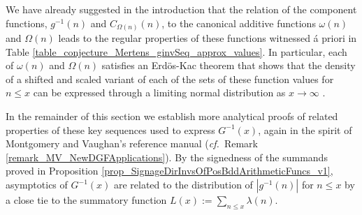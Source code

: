 \documentclass[11pt,reqno,a4letter]{article}
\numberwithin{figure}{section}
\numberwithin{table}{section}
\newcommand{\cf}{\textit{cf.\ }}
\theoremstyle{plain}
\numberwithin{theorem}{section}
\theoremstyle{definition}
\begin{document}
We have already suggested in the introduction that the relation of the component 
functions, $g^{-1}(n)$ and $C_{\Omega(n)}(n)$, to the canonical additive functions 
$\omega(n)$ and $\Omega(n)$ leads to the regular properties of these functions 
witnessed \'{a} priori in Table \ref{table_conjecture_Mertens_ginvSeq_approx_values}. 
In particular, each of $\omega(n)$ and $\Omega(n)$ satisfies 
an Erd\"os-Kac theorem that shows that the density of a shifted and scaled variant of each 
of the sets of these function values for $n \leq x$ can be expressed through a 
limiting normal distribution as $x \rightarrow \infty$ 
\cite{ERDOS-KAC-REF,BILLINGSLY-CLT-PRIMEDIVFUNC,RENYI-TURAN}. 

In the remainder of this section we establish more analytical proofs of 
related properties of these key sequences used to express $G^{-1}(x)$, 
again in the spirit of Montgomery and Vaughan's reference manual 
(\cf Remark \ref{remark_MV_NewDGFApplications}). 
By the signedness of the summands proved in 
Proposition \ref{prop_SignageDirInvsOfPosBddArithmeticFuncs_v1}, 
asymptotics of $G^{-1}(x)$ are related to the distribution of 
$|g^{-1}(n)|$ for $n \leq x$ by a close tie to the 
summatory function $L(x) := \sum_{n \leq x} \lambda(n)$. 
\end{document}
